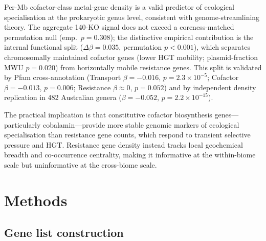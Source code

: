 \documentclass[times]{zHenriquesLab-StyleBioRxiv}
\begin{document}
Per-Mb cofactor-class metal-gene density is a valid predictor of
ecological specialisation at the prokaryotic genus level, consistent with
genome-streamlining theory. The aggregate 140-KO signal does not exceed a
coreness-matched permutation null (emp.\ $p = 0.308$); the distinctive
empirical contribution is the internal functional split ($\Delta\beta = 0.035$,
permutation $p < 0.001$), which separates chromosomally maintained cofactor genes (lower HGT mobility; plasmid-fraction MWU $p = 0.020$)
from horizontally mobile resistance genes. This split is validated by Pfam
cross-annotation (Transport $\beta = -0.016$, $p = 2.3 \times 10^{-5}$;
Cofactor $\beta = -0.013$, $p = 0.006$; Resistance $\beta \approx 0$,
$p = 0.052$) and by independent density replication in 482 Australian genera
($\beta = -0.052$, $p = 2.2 \times 10^{-15}$).

The practical implication is that constitutive cofactor biosynthesis
genes---particularly cobalamin---provide more stable genomic markers of
ecological specialisation than resistance gene counts, which respond to
transient selective pressure and HGT. Resistance gene density instead tracks
local geochemical breadth and co-occurrence centrality, making it informative
at the within-biome scale but uninformative at the cross-biome scale.




\section*{Methods}
\setcounter{subsection}{0}

\subsection{Gene list construction}
\end{document}
